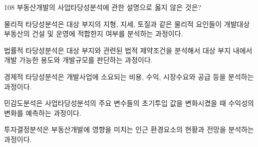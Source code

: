 \begin{question}{108}
부동산개발의 사업타당성분석에 관한 설명으로 옳지 않은 것은?
\begin{choices}
  \item 물리적 타당성분석은 대상 부지의 지형, 지세, 토질과 같은 물리적 요인들이 개발대상 부동산의 건설 및 운영에 적합한지 여부를 분석하는 과정이다.
  \item 법률적 타당성분석은 대상 부지와 관련된 법적 제약조건을 분석해서 대상 부지 내에서 개발 가능한 용도와 개발규모를 판단하는 과정이다.
  \item 경제적 타당성분석은 개발사업에 소요되는 비용, 수익, 시장수요와 공급 등을 분석하는 과정이다.
  \item 민감도분석은 사업타당성분석의 주요 변수들의 초기투입 값을 변화시켰을 때 수익성의 변화를 예측하는 과정이다.
  \item 투자결정분석은 부동산개발에 영향을 미치는 인근 환경요소의 현황과 전망을 분석하는 과정이다.
\end{choices}
\end{question}
